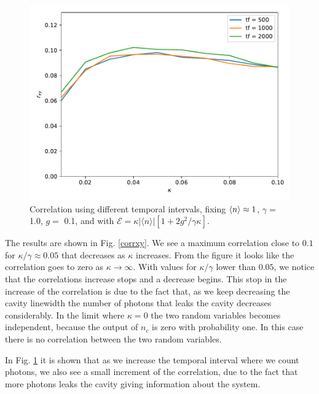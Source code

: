 \documentclass[conference]{IEEEtran}
\begin{document}
\begin{center}
\begin{figure}[h!]
\begin{center}
\includegraphics[scale = 0.45]{million2.pdf}
\caption{\small{Correlation using different temporal intervals, fixing $\expval{n} \approx 1$, $\gamma =$ 1.0, $g =$ 0.1, and with  $\mathcal{E} =  \kappa |\langle n \rangle|[1 + 2g^2/\gamma \kappa]$.}}  \label{errorzz}
\end{center}
\end{figure}
\end{center}

The results are shown in Fig. \ref{corrxy}. We see a maximum
correlation close to $0.1$ for $\kappa/\gamma\approx 0.05$ that
decreases as $\kappa$ increases. From the figure it looks like the
correlation goes to zero as $\kappa\rightarrow\infty$. With values for
$\kappa/\gamma$ lower than $0.05$, we notice that the correlations
increase stops and a decrease begins. This stop in the increase of the
correlation is due to the fact that, as we keep decreasing the cavity
linewidth the number of photons that leaks the cavity decreases
considerably. In the limit where $\kappa=0$ the two random
variables becomes independent, because the output of $n_c$ is zero
with probability one. In this case there is no correlation between the two
random variables.

In Fig. \ref{errorzz} it is shown that as we increase the temporal
interval where we count photons, we also see a small increment of the
correlation, due to the fact that more photons leaks the cavity
giving information about the system.
\end{document}

